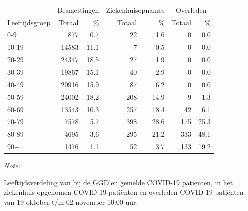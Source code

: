 \documentclass[
  english,
  man,floatsintext]{apa6}
\begin{document}
\begin{table}[H]
\centering\begingroup\fontsize{11}{13}\selectfont

\begin{threeparttable}
\begin{tabular}{lrrrrrr}
\toprule
\multicolumn{1}{c}{ } & \multicolumn{2}{c}{Besmettingen} & \multicolumn{2}{c}{Ziekenhuisopnames} & \multicolumn{2}{c}{Overleden} \\
\cmidrule(l{3pt}r{3pt}){2-3} \cmidrule(l{3pt}r{3pt}){4-5} \cmidrule(l{3pt}r{3pt}){6-7}
Leeftijdsgroep & Totaal & \% & Totaal & \% & Totaal & \%\\
\midrule
0-9 & 877 & 0.7 & 22 & 1.6 & 0 & 0.0\\
10-19 & 14583 & 11.1 & 7 & 0.5 & 0 & 0.0\\
20-29 & 24347 & 18.5 & 27 & 1.9 & 0 & 0.0\\
30-39 & 19867 & 15.1 & 40 & 2.9 & 0 & 0.0\\
40-49 & 20916 & 15.9 & 87 & 6.2 & 0 & 0.0\\
50-59 & 24002 & 18.2 & 208 & 14.9 & 9 & 1.3\\
60-69 & 13543 & 10.3 & 257 & 18.4 & 42 & 6.1\\
70-79 & 7578 & 5.7 & 398 & 28.6 & 175 & 25.3\\
80-89 & 4695 & 3.6 & 295 & 21.2 & 333 & 48.1\\
90+ & 1476 & 1.1 & 52 & 3.7 & 133 & 19.2\\
\bottomrule
\end{tabular}
\begin{tablenotes}
\item \textit{Note: } 
\item Leeftijdsverdeling van bij de GGD’en gemelde COVID-19 patiënten, in het ziekenhuis opgenomen COVID-19 patiënten en overleden COVID-19 patiënten van 19 oktober t/m 02 november 10:00 uur.
\end{tablenotes}
\end{threeparttable}
\endgroup{}
\end{table}
\end{document}
